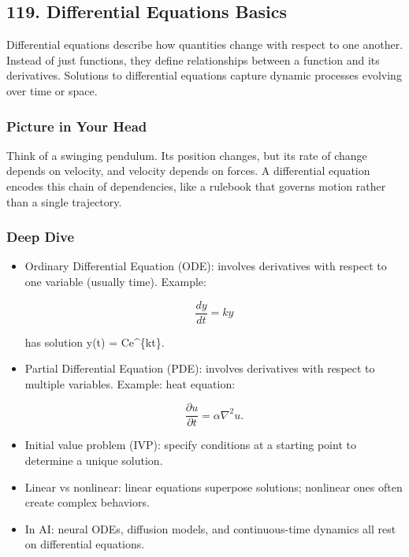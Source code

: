 \documentclass[
  letterpaper,
  DIV=11,
  numbers=noendperiod]{scrreprt}
\begin{document}
\subsection{119. Differential Equations
Basics}\label{differential-equations-basics}

Differential equations describe how quantities change with respect to
one another. Instead of just functions, they define relationships
between a function and its derivatives. Solutions to differential
equations capture dynamic processes evolving over time or space.

\subsubsection{Picture in Your Head}\label{picture-in-your-head-118}

Think of a swinging pendulum. Its position changes, but its rate of
change depends on velocity, and velocity depends on forces. A
differential equation encodes this chain of dependencies, like a
rulebook that governs motion rather than a single trajectory.

\subsubsection{Deep Dive}\label{deep-dive-118}

\begin{itemize}
\item
  Ordinary Differential Equation (ODE): involves derivatives with
  respect to one variable (usually time). Example:

  \[
  \frac{dy}{dt} = ky
  \]

  has solution y(t) = Ce\^{}\{kt\}.
\item
  Partial Differential Equation (PDE): involves derivatives with respect
  to multiple variables. Example: heat equation:

  \[
  \frac{\partial u}{\partial t} = \alpha \nabla^2 u.
  \]
\item
  Initial value problem (IVP): specify conditions at a starting point to
  determine a unique solution.
\item
  Linear vs nonlinear: linear equations superpose solutions; nonlinear
  ones often create complex behaviors.
\item
  In AI: neural ODEs, diffusion models, and continuous-time dynamics all
  rest on differential equations.
\end{itemize}
\end{document}
